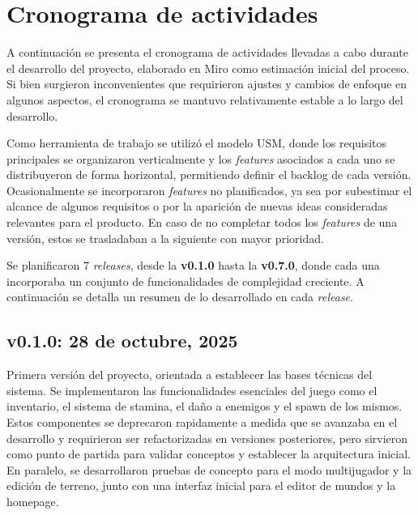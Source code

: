 \section{Cronograma de actividades}

A continuación se presenta el cronograma de actividades llevadas a cabo durante el desarrollo del proyecto, 
elaborado en Miro como estimación inicial del proceso. Si bien surgieron inconvenientes que requirieron 
ajustes y cambios de enfoque en algunos aspectos, el cronograma se mantuvo relativamente estable a lo 
largo del desarrollo.

\vspace{0.25cm}

Como herramienta de trabajo se utilizó el modelo USM, donde los requisitos principales se organizaron verticalmente 
y los \textit{features} asociados a cada uno se distribuyeron de forma horizontal, permitiendo definir el backlog 
de cada versión. Ocasionalmente se incorporaron \textit{features} no planificados, ya sea por subestimar el alcance 
de algunos requisitos o por la aparición de nuevas ideas consideradas relevantes para el producto. En caso 
de no completar todos los \textit{features} de una versión, estos se trasladaban a la siguiente con mayor prioridad.

\vspace{0.25cm}

Se planificaron 7 \textit{releases}, desde la \textbf{v0.1.0} hasta la \textbf{v0.7.0}, donde cada una incorporaba un conjunto de 
funcionalidades de complejidad creciente. A continuación se detalla un resumen de lo desarrollado en 
cada \textit{release}.

\subsection{v0.1.0: 28 de octubre, 2025}

Primera versión del proyecto, orientada a establecer las bases técnicas del sistema. Se implementaron 
las funcionalidades esenciales del juego como el inventario, el sistema de stamina, el daño a enemigos 
y el spawn de los mismos. Estos componentes se deprecaron rapidamente a medida que se avanzaba en el desarrollo
y requirieron ser refactorizadas en versiones posteriores, pero sirvieron como punto de partida para validar 
conceptos y establecer la arquitectura inicial. En paralelo, se desarrollaron pruebas de concepto para el modo multijugador 
y la edición de terreno, junto con una interfaz inicial para el editor de mundos y la homepage. 


